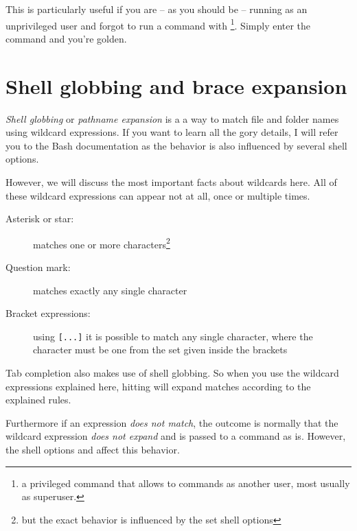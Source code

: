 \documentclass{olli-handout}
\begin{document}
This is particularly useful if you are -- as you should be -- running as an unprivileged user and forgot to run a command with \footnote{a privileged command that allows to commands as another user, most usually as superuser.}. Simply enter the command  and you're golden.

\begin{refmanbash}
\end{refmanbash}

\section{Shell globbing and brace expansion}

\begin{refmanbash}
\end{refmanbash}

\emph{Shell globbing} or \emph{pathname expansion} is a a way to match file and folder names using wildcard expressions. If you want to learn all the gory details, I will refer you to the Bash documentation as the behavior is also influenced by several shell options.

However, we will discuss the most important facts about wildcards here. All of these wildcard expressions can appear not at all, once or multiple times.

\begin{description}
	\item[Asterisk or star:] \TT{*} matches one or more characters\footnote{but the exact behavior is influenced by the set shell options}
	\item[Question mark:]  matches exactly any single character
	\item[Bracket expressions:] using \verb|[...]| it is possible to match any single character, where the character must be one from the set given inside the brackets
\end{description}

\begin{hintbox}
{\olliHandLeft} Tab completion also makes use of shell globbing. So when you use the wildcard expressions explained here, hitting \keys{\tab} will expand matches according to the explained rules.

{\olliHandLeft} Furthermore if an expression \emph{does not match}, the outcome is normally that the wildcard expression \emph{does not expand} and is passed to a command as is. However, the shell options  and  affect this behavior.
\end{hintbox}
\end{document}
